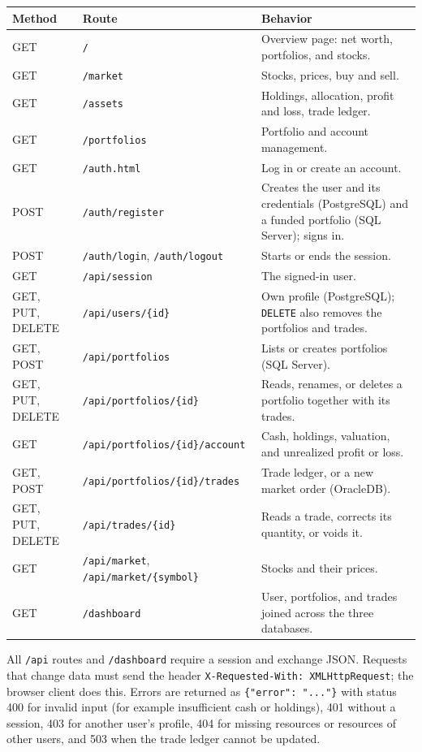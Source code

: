 \documentclass[12pt,a4paper]{article}
\newcommand{\code}[1]{\texttt{\small #1}}
\begin{document}
\begin{longtable}{>{\raggedright\arraybackslash}p{2.4cm}
                  >{\raggedright\arraybackslash}p{4.9cm}
                  >{\raggedright\arraybackslash}p{6.2cm}}
\toprule
\textbf{Method} & \textbf{Route} & \textbf{Behavior}\\
\midrule
\endhead
GET & \code{/} & Overview page: net worth, portfolios, and stocks.\\
GET & \code{/market} & Stocks, prices, buy and sell.\\
GET & \code{/assets} & Holdings, allocation, profit and loss, trade ledger.\\
GET & \code{/portfolios} & Portfolio and account management.\\
GET & \code{/auth.html} & Log in or create an account.\\
POST & \code{/auth/register} & Creates the user and its credentials
(PostgreSQL) and a funded portfolio (SQL Server); signs in.\\
POST & \code{/auth/login}, \code{/auth/logout} & Starts or ends the
session.\\
GET & \code{/api/session} & The signed-in user.\\
GET, PUT, DELETE & \code{/api/users/\{id\}} & Own profile (PostgreSQL);
\code{DELETE} also removes the portfolios and trades.\\
GET, POST & \code{/api/portfolios} & Lists or creates portfolios (SQL
Server).\\
GET, PUT, DELETE & \code{/api/portfolios/\{id\}} & Reads, renames, or deletes a
portfolio together with its trades.\\
GET & \code{/api/portfolios/\{id\}/\allowbreak account} & Cash, holdings, valuation, and
unrealized profit or loss.\\
GET, POST & \code{/api/portfolios/\{id\}/\allowbreak trades} & Trade ledger, or a new
market order (OracleDB).\\
GET, PUT, DELETE & \code{/api/trades/\{id\}} & Reads a trade, corrects its
quantity, or voids it.\\
GET & \code{/api/market}, \code{/api/market/\{symbol\}} & Stocks and their
prices.\\
GET & \code{/dashboard} & User, portfolios, and trades joined across the three
databases.\\
\bottomrule
\end{longtable}

All \code{/api} routes and \code{/dashboard} require a session and exchange
JSON. Requests that change data must send the header
\code{X-Requested-With: XMLHttpRequest}; the browser client does this.
Errors are returned as \code{\{"error": "..."\}} with status 400 for invalid
input (for example insufficient cash or holdings), 401 without a session,
403 for another user's profile, 404 for missing resources or resources of
other users, and 503 when the trade ledger cannot be updated.
\end{document}
